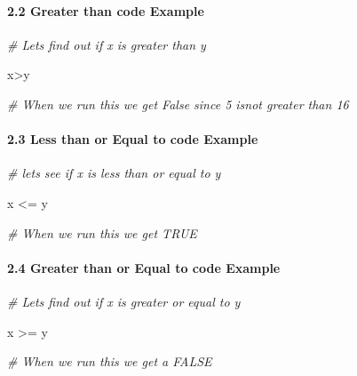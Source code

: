 \documentclass[
]{article}
\newenvironment{Shaded}{\begin{snugshade}}{\end{snugshade}}
\newcommand{\CommentTok}[1]{\textcolor[rgb]{0.56,0.35,0.01}{\textit{#1}}}
\newcommand{\NormalTok}[1]{#1}
\newcommand{\SpecialCharTok}[1]{\textcolor[rgb]{0.00,0.00,0.00}{#1}}
\begin{document}
\hypertarget{greater-than-code-example}{%
\paragraph{2.2 Greater than code
Example}\label{greater-than-code-example}}

\begin{Shaded}
\begin{Highlighting}[]

\CommentTok{\# Let\textquotesingle{}s find out if x is greater than y}

\NormalTok{x}\SpecialCharTok{\textgreater{}}\NormalTok{y}

\CommentTok{\# When we run this we get False since 5 isnot greater than 16}
\end{Highlighting}
\end{Shaded}

\hypertarget{less-than-or-equal-to-code-example}{%
\paragraph{2.3 Less than or Equal to code
Example}\label{less-than-or-equal-to-code-example}}

\begin{Shaded}
\begin{Highlighting}[]

\CommentTok{\# lets see if x is less than or equal to y}

\NormalTok{x }\SpecialCharTok{\textless{}=}\NormalTok{ y}

\CommentTok{\# When we run this we get TRUE}
\end{Highlighting}
\end{Shaded}

\hypertarget{greater-than-or-equal-to-code-example}{%
\paragraph{2.4 Greater than or Equal to code
Example}\label{greater-than-or-equal-to-code-example}}

\begin{Shaded}
\begin{Highlighting}[]

\CommentTok{\# Let\textquotesingle{}s find out if x is greater or equal to y}

\NormalTok{x }\SpecialCharTok{\textgreater{}=}\NormalTok{ y}

\CommentTok{\# When we run this we get a FALSE}
\end{Highlighting}
\end{Shaded}
\end{document}
